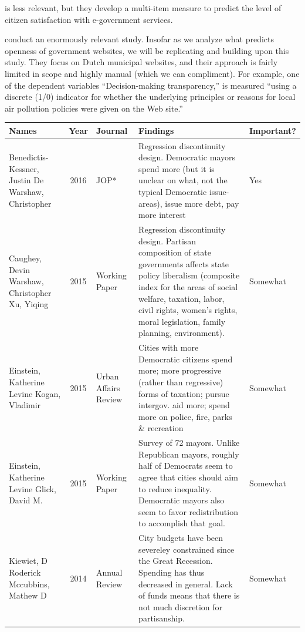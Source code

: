 \documentclass[11pt]{article}
\begin{document}
\cite{osman2014cobra} is less relevant, but they develop a multi-item measure to predict the level of citizen satisfaction with e-government services. 


\cite{grimmelikhuijsen2012developing} conduct an enormously relevant study. Insofar as we analyze what predicts openness of government websites, we will be replicating and building upon this study. They focus on Dutch municipal websites, and their approach is fairly limited in scope and highly manual (which we can compliment). For example, one of the dependent variables ``Decision-making transparency,'' is measured ``using a discrete (1/0) indicator for whether the underlying principles or reasons for local air pollution policies were given on the Web site.'' 

\begin{landscape}
\begin{table}[htbp]
	\begin{tabular}{|p{2cm}|c|p{3cm}|p{12cm}|l|}
		\hline
		Names & Year & Journal & Findings & Important? \\ \hline
		Benedictis-Kessner, Justin De
		Warshaw, Christopher & 2016 & JOP* & Regression discontinuity design. Democratic mayors spend more (but it is unclear on what, not the typical Democratic issue-areas), issue more debt, pay more interest & Yes \\ \hline
		Caughey, Devin
		Warshaw, Christopher
		Xu, Yiqing & 2015 & Working Paper & Regression discontinuity design. Partisan composition of state governments affects state policy liberalism (composite index for the areas of social welfare, taxation, labor, civil rights, women’s rights, moral legislation, family planning, environment). & Somewhat \\ \hline
		Einstein, Katherine Levine
		Kogan, Vladimir & 2015 & Urban Affairs Review & Cities with more Democratic citizens spend more; more progressive (rather than regressive) forms of taxation; pursue intergov. aid more; spend more on police, fire, parks \& recreation & Somewhat \\ \hline
		Einstein, Katherine Levine
		Glick, David M. & 2015 & Working Paper & Survey of 72 mayors. Unlike Republican mayors, roughly half of Democrats seem to agree that cities should aim to reduce inequality. Democratic mayors also seem to favor redistribution to accomplish that goal. & Somewhat \\ \hline
		Kiewiet, D Roderick
		Mccubbins, Mathew D & 2014 & Annual Review & City budgets have been severeley constrained since the Great Recession. Spending has thus decreased in general. Lack of funds means that there is not much discretion for partisanship. & Somewhat \\ \hline

\end{tabular}
\end{table}
\end{landscape}
\end{document}
